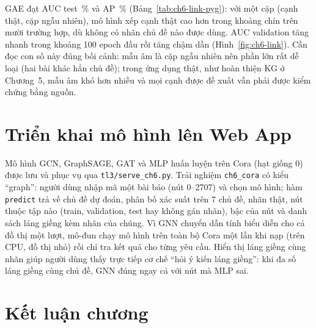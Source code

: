 GAE đạt AUC test \,\% và AP \,\%
(Bảng~\ref{tab:ch6-link-pyg}): với một cặp (cạnh thật, cặp ngẫu nhiên), mô hình xếp cạnh thật cao hơn trong khoảng chín
trên mười trường hợp, dù không có nhãn chủ đề nào được dùng. AUC validation tăng nhanh trong khoảng 100 epoch đầu rồi tăng chậm dần
(Hình~\ref{fig:ch6-link}). Cần đọc con số này đúng bối cảnh: mẫu âm là cặp ngẫu nhiên nên phần lớn rất dễ loại (hai bài
khác hẳn chủ đề); trong ứng dụng thật, như hoàn thiện KG ở Chương~5, mẫu âm khó hơn nhiều và mọi cạnh được đề xuất vẫn
phải được kiểm chứng bằng nguồn.

\section{Triển khai mô hình lên Web App}
\label{sec:gnn-deploy}

Mô hình GCN, GraphSAGE, GAT và MLP huấn luyện trên Cora (hạt giống 0) được lưu và phục vụ qua \texttt{tl3/serve\_ch6.py}.
Trải nghiệm \texttt{ch6\_cora} có kiểu ``graph'': người dùng nhập mã một bài báo (nút 0--2707) và chọn mô hình; hàm
\texttt{predict} trả về chủ đề dự đoán, phân bố xác suất trên 7 chủ đề, nhãn thật, nút thuộc tập nào (train, validation,
test hay không gán nhãn), bậc của nút và danh sách láng giềng kèm nhãn của chúng. Vì GNN chuyển dẫn tính biểu diễn cho cả
đồ thị một lượt, mô-đun chạy mô hình trên toàn bộ Cora một lần khi nạp (trên CPU, đồ thị nhỏ) rồi chỉ tra kết quả cho từng
yêu cầu. Hiển thị láng giềng cùng nhãn giúp người dùng thấy trực tiếp cơ chế ``hỏi ý kiến láng giềng'': khi đa số láng
giềng cùng chủ đề, GNN đúng ngay cả với nút mà MLP sai.



\section{Kết luận chương}

